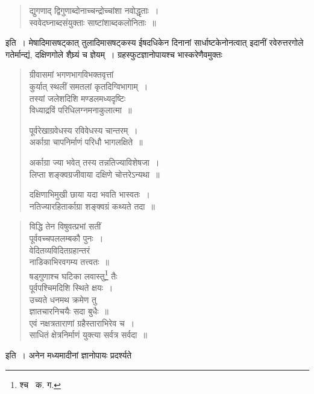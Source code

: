 \documentclass[11pt, openany]{book}
\begin{document}
\begin{quote}
{\qt द्युगणाद् द्विगुणाब्दोनाच्चन्द्रोच्चांशा नवोद्धृताः~।\\
स्ववेदघ्नाब्दसंयुक्ताः साष्टांशाब्दकलोनिताः~॥}
\end{quote}

\noindent इति~। मेषादिमासषट्कात् तुलादिमासषट्कस्य ईषदधिकेन दिनानां सार्धाष्टकेनोनत्वात् इदानीं रवेरुत्तरगोले गतेर्मान्द्यं, दक्षिणगोले
शैघ्र्यं च ज्ञेयम्~। ग्रहस्फुटज्ञानोपायश्च भास्करेणैवमुक्तः\textendash 
\begin{quote}
{\qt ग्रीवासमां भगणभागविभक्तवृत्तां\\
 कुर्यात् स्थलीं समतलां कृतदिग्विभागाम्~।\\
तस्यां जलेशदिशि मण्डलमध्यदृष्टिः\\
विध्याद्रविं परिधिलग्नमनाकुलात्मा~॥

पूर्वरेखाग्रवेधस्य रविवेधस्य चान्तरम्~।\\
अर्काग्रा चापनिर्माणं परिधौ भागलक्षिते~॥
 
अर्काग्रा ज्या भवेत् तस्य तन्नतिज्याविशेषजा~।\\
लिप्ता शङ्क्वग्रजीवाया दक्षिणे चोत्तरेऽन्यथा~॥

दक्षिणाभिमुखी छाया यदा भवति भास्वतः~।\\
नतिज्यारहितार्काग्रा शङ्क्वग्रं कथ्यते तदा~॥}
\end{quote}

\newpage
\begin{quote}
{\qt विद्धि तेन विषुवत्प्रभां सतीं\\
 पूर्ववच्चपललम्बकौ पुनः~।\\
 वेदितव्यविदितग्रहान्तरं\\
 नाडिकाभिरवगम्य तत्त्वतः~॥\\
 षड्गुणाश्च घटिका लवास्तु\renewcommand{\thefootnote}{१}\footnote{श्च \textendash\ क. ग.} तैः\\
 पूर्वपश्चिमदिशि स्थिते क्षयः~।\\
 उच्यते धनमथ क्रमेण तु\\
 ज्ञातचारनिचयैः सदा बुधैः~॥\\
 एवं नक्षत्रताराणां ग्रहैस्ताराभिरेव च~।\\
 साधितं क्षेत्रनिर्माणं युक्त्या सर्वत्र सर्वदा~॥}
\end{quote}

\noindent इति~। अनेन मध्यमादीनां ज्ञानोपायः प्रदर्श्यते\textendash 
\end{document}
